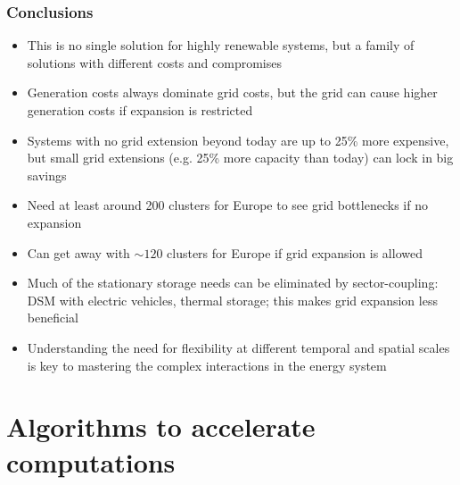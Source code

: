 \documentclass[10pt,aspectratio=169,dvipsnames]{beamer}
\let\olditem\item
\renewcommand{\item}{%
\olditem\vspace{5pt}}
\begin{document}
\begin{frame}
  \frametitle{Conclusions}

  \begin{itemize}
    \item This is \alert{no single solution} for highly renewable systems, but a \alert{family of solutions}  with different costs and compromises
    \item Generation costs always dominate grid costs, but the grid can cause higher generation costs if expansion is restricted
    \item Systems with no grid extension beyond today are up to 25\% more expensive, but small grid extensions (e.g. 25\% more capacity than today) can lock in big savings
    \item Need at least around 200 clusters for Europe to see grid bottlenecks if no expansion
    \item Can get away with $\sim 120$ clusters for Europe if grid expansion is allowed
      \item Much of the stationary storage needs can be eliminated by sector-coupling: DSM with electric vehicles, thermal storage; this makes grid expansion less beneficial
    \item Understanding the need for \alert{flexibility at different temporal and spatial scales} is key to mastering the complex interactions in the energy system
  \end{itemize}
\end{frame}

\section{Algorithms to accelerate computations}
\end{document}
